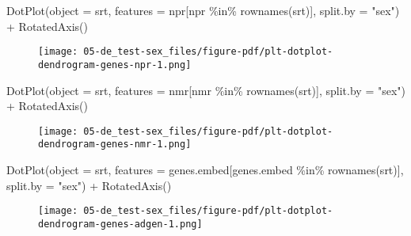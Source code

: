 \documentclass[
  letterpaper,
  DIV=11,
  numbers=noendperiod]{scrartcl}
\newenvironment{Shaded}{\begin{snugshade}}{\end{snugshade}}
\newcommand{\AttributeTok}[1]{\textcolor[rgb]{0.40,0.45,0.13}{#1}}
\newcommand{\FunctionTok}[1]{\textcolor[rgb]{0.28,0.35,0.67}{#1}}
\newcommand{\NormalTok}[1]{\textcolor[rgb]{0.00,0.23,0.31}{#1}}
\newcommand{\SpecialCharTok}[1]{\textcolor[rgb]{0.37,0.37,0.37}{#1}}
\newcommand{\StringTok}[1]{\textcolor[rgb]{0.13,0.47,0.30}{#1}}
\begin{document}
\begin{Shaded}
\begin{Highlighting}[]
\FunctionTok{DotPlot}\NormalTok{(}\AttributeTok{object =}\NormalTok{ srt, }\AttributeTok{features =}\NormalTok{ npr[npr }\SpecialCharTok{\%in\%} \FunctionTok{rownames}\NormalTok{(srt)], }\AttributeTok{split.by =} \StringTok{"sex"}\NormalTok{) }\SpecialCharTok{+} \FunctionTok{RotatedAxis}\NormalTok{()}
\end{Highlighting}
\end{Shaded}

\begin{figure}[H]

{\centering \texttt{[image: 05-de\_test-sex\_files/figure-pdf/plt-dotplot-dendrogram-genes-npr-1.png]}

}

\end{figure}

\begin{Shaded}
\begin{Highlighting}[]
\FunctionTok{DotPlot}\NormalTok{(}\AttributeTok{object =}\NormalTok{ srt, }\AttributeTok{features =}\NormalTok{ nmr[nmr }\SpecialCharTok{\%in\%} \FunctionTok{rownames}\NormalTok{(srt)], }\AttributeTok{split.by =} \StringTok{"sex"}\NormalTok{) }\SpecialCharTok{+} \FunctionTok{RotatedAxis}\NormalTok{()}
\end{Highlighting}
\end{Shaded}

\begin{figure}[H]

{\centering \texttt{[image: 05-de\_test-sex\_files/figure-pdf/plt-dotplot-dendrogram-genes-nmr-1.png]}

}

\end{figure}

\begin{Shaded}
\begin{Highlighting}[]
\FunctionTok{DotPlot}\NormalTok{(}\AttributeTok{object =}\NormalTok{ srt, }\AttributeTok{features =}\NormalTok{ genes.embed[genes.embed }\SpecialCharTok{\%in\%} \FunctionTok{rownames}\NormalTok{(srt)], }\AttributeTok{split.by =} \StringTok{"sex"}\NormalTok{) }\SpecialCharTok{+} \FunctionTok{RotatedAxis}\NormalTok{()}
\end{Highlighting}
\end{Shaded}

\begin{figure}[H]

{\centering \texttt{[image: 05-de\_test-sex\_files/figure-pdf/plt-dotplot-dendrogram-genes-adgen-1.png]}

}

\end{figure}
\end{document}
